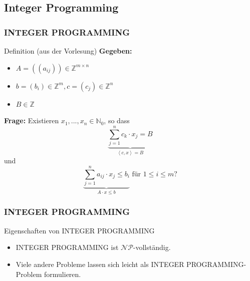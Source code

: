 \subsection{Integer Programming}
\begin{frame}
 \frametitle{INTEGER PROGRAMMING}
 \begin{block}{Definition (aus der Vorlesung)}
 \textbf{Gegeben: }
 \begin{itemize}
  \item $A = ((a_{ij})) \in \mathbb{Z}^{m \times n}$
  \item $b = (b_i) \in \mathbb{Z}^m, c = (c_j) \in \mathbb{Z}^n$
  \item $B\in \mathbb{Z}$
 \end{itemize}
\textbf{Frage: } Existieren $x_1, ..., x_n \in \mathbb{N}_0$, so dass $$\underbrace{\sum_{j=1}^n c_k \cdot x_j = B}_{\left\langle c, x\right\rangle = B}$$ und $$\underbrace{\sum_{j=1}^n a_{ij} \cdot x_j \leq b_i}_{A \cdot x \leq b } \text{ für } 1 \leq i \leq m ?$$
 \end{block}
\end{frame}

\begin{frame}
 \frametitle{INTEGER PROGRAMMING}
 \begin{block}{Eigenschaften von INTEGER PROGRAMMING}
 \begin{itemize}
  \item INTEGER PROGRAMMING ist $\mathcal{NP}$-vollständig.
  \item Viele andere Probleme lassen sich leicht als INTEGER PROGRAMMING-Problem formulieren.
 \end{itemize}
 \end{block}
\end{frame}

